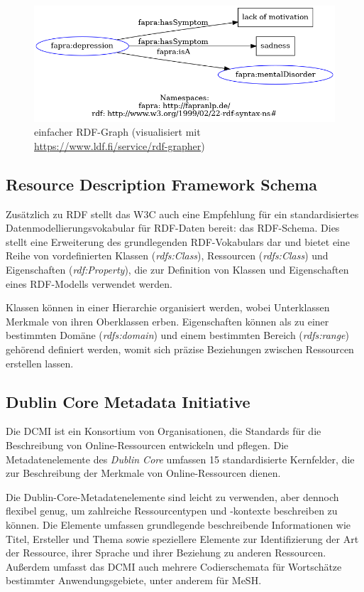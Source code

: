 \begin{figure}[h]
    \centering
    \includegraphics[width=\textwidth]{pictures/rdf-graph.png}
    \caption{einfacher RDF-Graph (visualisiert mit \url{https://www.ldf.fi/service/rdf-grapher})}
    \label{fig:rdfgraph}
\end{figure}

\subsection{Resource Description Framework Schema}

Zusätzlich zu RDF stellt das W3C auch eine Empfehlung für ein standardisiertes Datenmodellierungsvokabular für RDF-Daten bereit: das RDF-Schema. Dies stellt eine Erweiterung des grundlegenden RDF-Vokabulars dar und bietet eine Reihe von vordefinierten Klassen (\emph{rdfs:Class}), Ressourcen (\emph{rdfs:Class}) und Eigenschaften (\emph{rdf:Property}), die zur Definition von Klassen und Eigenschaften eines RDF-Modells verwendet werden.

Klassen können in einer Hierarchie organisiert werden, wobei Unterklassen Merkmale von ihren Oberklassen erben. Eigenschaften können als zu einer bestimmten Domäne (\emph{rdfs:domain}) und einem bestimmten Bereich (\emph{rdfs:range}) gehörend definiert werden, womit sich präzise Beziehungen zwischen Ressourcen erstellen lassen.



\subsection{Dublin Core Metadata Initiative}
Die \ac{DCMI}\cite{DCMI_dcmi_2022} ist ein Konsortium von Organisationen, die Standards für die Beschreibung von Online-Ressourcen entwickeln und pflegen. Die Metadatenelemente des \emph{Dublin Core} umfassen 15 standardisierte Kernfelder, die zur Beschreibung der Merkmale von Online-Ressourcen dienen.

Die Dublin-Core-Metadatenelemente sind leicht zu verwenden, aber dennoch flexibel genug, um zahlreiche Ressourcentypen und -kontexte beschreiben zu können. Die Elemente umfassen grundlegende beschreibende Informationen wie Titel, Ersteller und Thema sowie speziellere Elemente zur Identifizierung der Art der Ressource, ihrer Sprache und ihrer Beziehung zu anderen Ressourcen. Außerdem umfasst das \ac{DCMI} auch mehrere Codierschemata für Wortschätze bestimmter Anwendungsgebiete, unter anderem für \ac{MeSH}.



